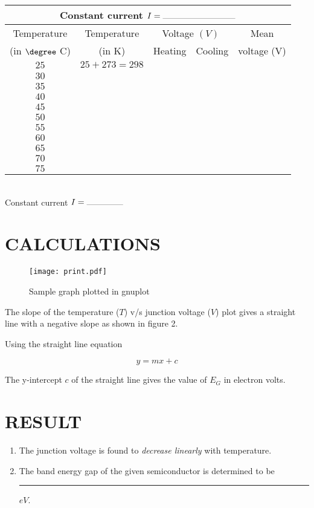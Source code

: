 \documentclass[12pt,a4paper]{article}
\begin{document}
		\begin{tabular}{|c|c|c|c|c|}
			\hline
			\multicolumn{5}{|c|}{Constant current $I= \rule{20ex}{0.2pt}$}\\ \hline
			\rowcolor{b1!25}Temperature&  Temperature&  \multicolumn{2}{c|}{Voltage $(V)$}&  Mean\\ \cline{3-4}  
			\rowcolor{b1!25}(in $\degree$ C)&  (in K)&  Heating&  Cooling&  voltage (V)\\ \hline
			
			$25$ &$25+273=298$ &&&\\ \hline
			$30$ &&&&\\ \hline
			$35$&&&&\\ \hline
			$40$&&&&\\ \hline
			$45$&&&&\\ \hline
			$50$&&&&\\ \hline
			$55$&&&&\\ \hline
			$60$&&&&\\ \hline
			$65$&&&&\\ \hline
			$70$&&&&\\ \hline
			$75$&&&&\\ \hline
		\end{tabular}
		\vspace{10pt}\\
		Constant current $I = \rule{10ex}{0.2pt}$
		
		\newpage
		
		\section{\textcolor{b1}{CALCULATIONS}}
			
			\begin{figure}[!htb]
				\centering
				\texttt{[image: print.pdf]}
				\caption{Sample graph plotted in gnuplot}
			\end{figure}
			
			The slope of the temperature ($T$) v/s junction voltage ($V$) plot gives a straight line with a negative slope as shown in figure 2.
			
			Using the straight line equation 
			
			$$y=mx+c$$
			
			The y-intercept $c$ of the straight line gives the value of $E_G$ in electron volts.
			
			
			\section{\textcolor{b1}{RESULT}}
			
			\begin{enumerate}
				\item	The junction voltage is found to \textit{decrease linearly} with temperature.
				
				\item	The band energy gap of the given semiconductor is determined to be \rule{10ex}{0.2pt}$eV$.
				
			\end{enumerate}
			
\end{document}
